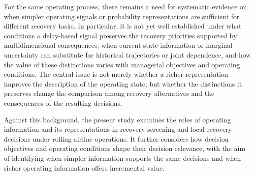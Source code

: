 For the same operating process, there remains a need for systematic evidence on when simpler operating signals or probability representations are sufficient for different recovery tasks. In particular, it is not yet well established under what conditions a delay-based signal preserves the recovery priorities supported by multidimensional consequences, when current-state information or marginal uncertainty can substitute for historical trajectories or joint dependence, and how the value of these distinctions varies with managerial objectives and operating conditions. The central issue is not merely whether a richer representation improves the description of the operating state, but whether the distinctions it preserves change the comparison among recovery alternatives and the consequences of the resulting decisions.

Against this background, the present study examines the roles of operating information and its representations in recovery screening and local-recovery decisions under rolling airline operations. It further considers how decision objectives and operating conditions shape their decision relevance, with the aim of identifying when simpler information supports the same decisions and when richer operating information offers incremental value.
